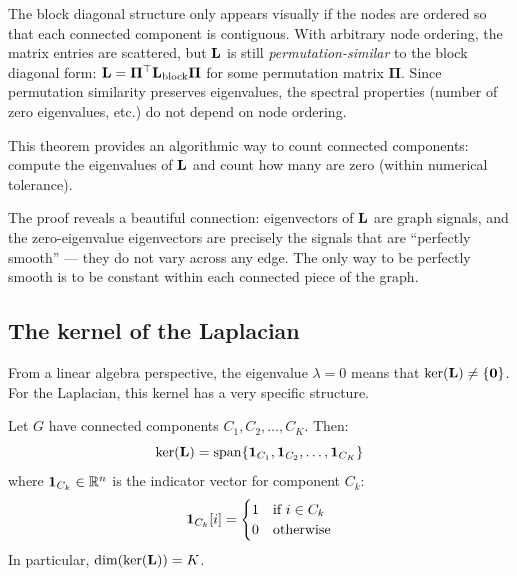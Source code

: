 \begin{notechapter}
\begin{remark}
The block diagonal structure only appears visually if the nodes are ordered so that each connected component is contiguous. With arbitrary node ordering, the matrix entries are scattered, but $\mathbf{L}$ is still \emph{permutation-similar} to the block diagonal form: $\mathbf{L} = \boldsymbol{\Pi}^\top \mathbf{L}_{\text{block}} \boldsymbol{\Pi}$ for some permutation matrix $\boldsymbol{\Pi}$. Since permutation similarity preserves eigenvalues, the spectral properties (number of zero eigenvalues, etc.) do not depend on node ordering.
\end{remark}

\begin{remark}
This theorem provides an algorithmic way to count connected components: compute the eigenvalues of $\mathbf{L}$ and count how many are zero (within numerical tolerance).
\end{remark}

\begin{intuition}
The proof reveals a beautiful connection: eigenvectors of $\mathbf{L}$ are graph signals, and the zero-eigenvalue eigenvectors are precisely the signals that are ``perfectly smooth'' --- they do not vary across any edge. The only way to be perfectly smooth is to be constant within each connected piece of the graph.
\end{intuition}

\subsection{The kernel of the Laplacian}

From a linear algebra perspective, the eigenvalue $\lambda = 0$ means that $\ker(\mathbf{L}) \neq \{\mathbf{0}\}$. For the Laplacian, this kernel has a very specific structure.

\begin{theorem}\label{graph-laplacians:thm:kernel-structure}
Let $G$ have connected components $C_1, C_2, \ldots, C_K$. Then:
\begin{equation}
\ker(\mathbf{L}) = \mathrm{span}\{\mathbf{1}_{C_1}, \mathbf{1}_{C_2}, \ldots, \mathbf{1}_{C_K}\}
\end{equation}
where $\mathbf{1}_{C_k} \in \mathbb{R}^n$ is the indicator vector for component $C_k$:
\[
\mathbf{1}_{C_k}[i] = \begin{cases} 1 & \text{if } i \in C_k \\ 0 & \text{otherwise} \end{cases}
\]
In particular, $\dim(\ker(\mathbf{L})) = K$.
\end{theorem}


\end{notechapter}
